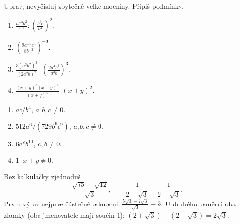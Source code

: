 \documentclass[11pt,a4paper]{article}
\begin{document}
\begin{zadaniReseniBox}[title={Samostatná práce 2},breakable=false]
Uprav, nevyčísluj zbytečně velké mocniny. Připiš podmínky.
\begin{enumerate}[label=\alph*)]
\item $\displaystyle\frac{a^{-3}b^2}{c^{-3}}:
\left(\frac{b^3c}{a^2}\right)^2$.
\item $\displaystyle\left(\frac{9a^{-2}c^3}{8b^{-2}}\right)^{-3}$.
\item $\displaystyle\frac{3(a^3b^2)^3}{(2a^2b)^2}\cdot
\left(\frac{2a^4b^3}{a^3b}\right)^3$.
\item $\displaystyle\frac{(x+y)^3(x+y)^4}{(x+y)^5}:(x+y)^2$.
\end{enumerate}
\tcblower
\begin{enumerate}[label=\alph*)]
\item $\boxed{ac/b^4}$, $a,b,c\ne0$.
\item $\boxed{512a^6/(729b^6c^9)}$, $a,b,c\ne0$.
\item $\boxed{6a^8b^{10}}$, $a,b\ne0$.
\item $\boxed1$, $x+y\ne0$.
\end{enumerate}
\end{zadaniReseniBox}


\begin{prikladReseniBox}[title={Příklad 2},breakable=false]
Bez kalkulačky zjednoduš
\[
\frac{\sqrt{75}-\sqrt{12}}{\sqrt3},
\qquad
\frac1{2-\sqrt3}-\frac1{2+\sqrt3}.
\]
\tcblower
První výraz nejprve částečně odmocni:
$\frac{5\sqrt3-2\sqrt3}{\sqrt3}=\boxed3$.
U druhého usměrni oba zlomky (oba jmenovatele mají součin $1$):
$(2+\sqrt3)-(2-\sqrt3)=\boxed{2\sqrt3}$.
\end{prikladReseniBox}
\end{document}

